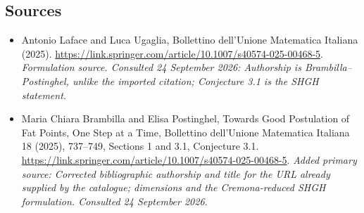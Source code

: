 \documentclass[11pt]{article}
\begin{document}
\subsection{Sources}
\begin{itemize}
\item[S1]Antonio Laface and Luca Ugaglia, Bollettino dell'Unione Matematica Italiana (2025).
\url{https://link.springer.com/article/10.1007/s40574-025-00468-5}.
\textit{Formulation source. Consulted 24 September 2026: Authorship is Brambilla–Postinghel, unlike the imported citation; Conjecture 3.1 is the SHGH statement.}
\item[E1]Maria Chiara Brambilla and Elisa Postinghel, Towards Good Postulation of Fat Points, One Step at a Time, Bollettino dell’Unione Matematica Italiana 18 (2025), 737–749, Sections 1 and 3.1, Conjecture 3.1.
\url{https://link.springer.com/article/10.1007/s40574-025-00468-5}.
\textit{Added primary source: Corrected bibliographic authorship and title for the URL already supplied by the catalogue; dimensions and the Cremona-reduced SHGH formulation. Consulted 24 September 2026.}
\end{itemize}
\end{document}
